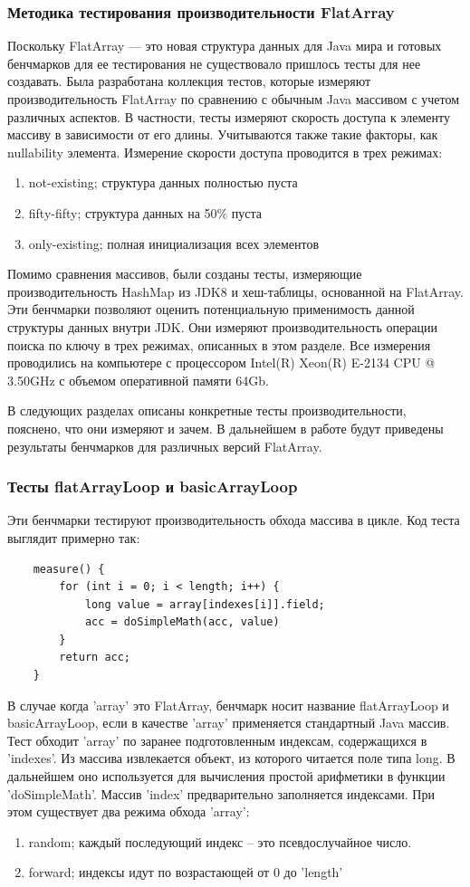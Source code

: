 \subsubsection{Методика тестирования производительности FlatArray}
Поскольку FlatArray --- это новая структура данных для Java мира и готовых бенчмарков для ее
тестирования не существовало пришлось тесты для нее создавать. 
Была разработана коллекция тестов, которые измеряют производительность FlatArray по сравнению
с обычным Java массивом с учетом различных аспектов.
В частности, тесты измеряют скорость доступа к элементу массиву в зависимости от его длины. Учитываются также такие факторы, как nullability элемента. Измерение скорости доступа проводится в трех режимах:
\begin{enumerate}
	\item not-existing; структура данных полностью пуста
	\item fifty-fifty; структура данных на 50\% пуста
	\item only-existing; полная инициализация всех элементов
\end{enumerate}
Помимо сравнения массивов, были созданы тесты, измеряющие производительность HashMap из JDK8 и хеш-таблицы, основанной на FlatArray. Эти бенчмарки позволяют оценить потенциальную применимость данной структуры данных внутри JDK. Они измеряют производительность операции поиска по ключу в трех режимах, описанных в этом разделе.
Все измерения проводились на компьютере с процессором Intel(R) Xeon(R) E-2134 CPU @ 3.50GHz
с объемом оперативной памяти 64Gb.
\par

В следующих разделах описаны конкретные тесты производительности, пояснено, что они измеряют
и зачем. В дальнейшем в работе будут приведены результаты бенчмарков для различных версий FlatArray.

\subsubsection{Тесты flatArrayLoop и basicArrayLoop}
Эти бенчмарки тестируют производительность обхода массива в цикле. Код теста выглядит примерно так:
\begin{lstlisting}
	measure() {
		for (int i = 0; i < length; i++) {
			long value = array[indexes[i]].field;
			acc = doSimpleMath(acc, value)
		}
		return acc;
	}
\end{lstlisting}
В случае когда 'array' это FlatArray, бенчмарк носит название flatArrayLoop и basicArrayLoop, если в качестве 'array' применяется стандартный Java массив.
Тест обходит 'array' по заранее подготовленным индексам, содержащихся в 'indexes'. 
Из массива извлекается объект, из которого читается поле типа long. В дальнейшем оно используется для вычисления простой арифметики в функции 'doSimpleMath'. 
Массив 'index' предварительно заполняется индексами. При этом существует два режима обхода 'array':
\begin{enumerate}
	\item random; каждый последующий индекс -- это псевдослучайное число.
	\item forward; индексы идут по возрастающей от 0 до 'length'
\end{enumerate}

